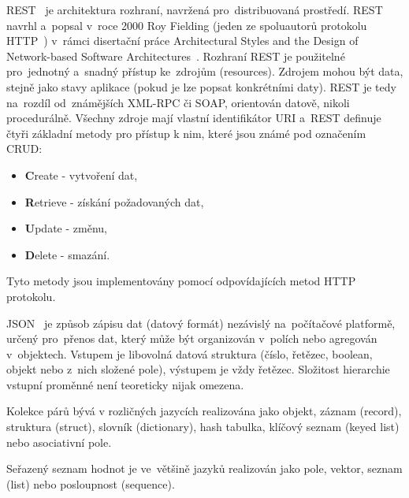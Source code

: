 REST~\cite{rest} je architektura rozhraní, navržená pro~distribuovaná prostředí. REST navrhl a~popsal v~roce 2000 Roy Fielding (jeden ze spoluautorů protokolu HTTP~\cite{http}) v~rámci disertační práce Architectural Styles and the Design of Network-based Software Architectures~\cite{rest-publication}. Rozhraní REST je použitelné pro~jednotný a~snadný přístup ke~zdrojům (resources). Zdrojem mohou být data, stejně jako stavy aplikace (pokud je lze popsat konkrétními daty). REST je tedy na~rozdíl od~známějších XML-RPC či SOAP, orientován datově, nikoli procedurálně. Všechny zdroje mají vlastní identifikátor URI a~REST definuje čtyři základní metody pro přístup k nim, které jsou známé pod označením CRUD:
\begin{itemize}
	\setlength{\parskip}{0pt}
	\setlength{\itemsep}{0pt}
	\item {\textbf{C}reate - vytvoření dat,}
	\item {\textbf{R}etrieve - získání požadovaných dat,}
	\item {\textbf{U}pdate - změnu,}
	\item {\textbf{D}elete - smazání.}
\end{itemize} 
Tyto metody jsou implementovány pomocí odpovídajících metod HTTP protokolu.

JSON~\cite{json} je způsob zápisu dat (datový formát) nezávislý na~počítačové platformě, určený pro~přenos dat, který může být organizován v~polích nebo agregován v~objektech. Vstupem je libovolná datová struktura (číslo, řetězec, boolean, objekt nebo z~nich složené pole), výstupem je vždy řetězec. Složitost hierarchie vstupní proměnné není teoreticky nijak omezena. 

Kolekce párů  bývá v rozličných jazycích realizována jako objekt, záznam (record), struktura (struct), slovník (dictionary), hash tabulka, klíčový seznam (keyed list) nebo asociativní pole.

Seřazený seznam hodnot je ve~většině jazyků realizován jako pole, vektor, seznam (list) nebo posloupnost (sequence).


